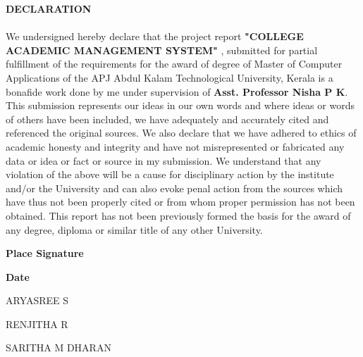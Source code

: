 \documentclass[a4paper, 12pt]{report}
\begin{document}
\newpage
\begin{titlepage}

{\fontsize{16pt}{16pt}\selectfont\bfseries\center DECLARATION \par}
\fontsize{12pt}{12pt}\selectfont
\paragraph{}We undersigned hereby declare that the project report \textbf{"COLLEGE ACADEMIC MANAGEMENT SYSTEM"} , submitted for
partial fulfillment of the requirements for the award of degree of Master of Computer Applications of
the APJ Abdul Kalam Technological University, Kerala is a bonafide work done by me
under supervision of  \textbf{Asst. Professor Nisha P K}. This submission represents our ideas in
our own words and where ideas or words of others have been included, we have adequately
and accurately cited and referenced the original sources. We also declare that we have
adhered to ethics of academic honesty and integrity and have not misrepresented or
fabricated any data or idea or fact or source in my submission. We understand that any
violation of the above will be a cause for disciplinary action by the institute and/or the
University and can also evoke penal action from the sources which have thus not been
properly cited or from whom proper permission has not been obtained. This report has
not been previously formed the basis for the award of any degree, diploma or similar title
of any other University.
\\\vspace{6cm}

{\fontsize{14pt}{14pt}\selectfont\bfseries Place \hspace{250pt}  Signature\par}
{\fontsize{14pt}{14pt}\selectfont\bfseries Date\par}
\begin{center}
	{\fontsize{13pt}{13pt}\selectfont \hspace{250pt}ARYASREE S\par}\vspace{0.2cm}
 {\fontsize{13pt}{13pt}\selectfont \hspace{250pt}RENJITHA R\par}\vspace{0.2cm}
{\fontsize{13pt}{13pt}\selectfont \hspace{250pt}SARITHA M DHARAN\par}

\end{center}
\end{titlepage}
\end{document}

